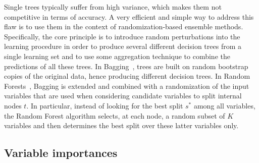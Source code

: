 \documentclass{article}
\begin{document}
Single trees typically suffer from high variance, which makes them not
competitive in terms of accuracy. A very efficient and simple way to address
this flaw is to use them in the context of randomization-based ensemble methods.
Specifically, the core principle is to introduce random perturbations into the
learning procedure in order to produce several different decision trees from a
single learning set and to use some aggregation technique to combine the predictions of all these trees.  In Bagging~\citep{breiman1996bagging}, trees are built on
random bootstrap copies of the original data, hence producing different decision
trees. In Random Forests~\citep{breiman2001rf}, Bagging is extended and combined
with a randomization of the input variables that are used when considering
candidate variables to split internal nodes $t$. In particular, instead of
looking for the best split $s^*$ among all variables, the Random Forest algorithm selects, at
each node, a random subset of $K$ variables and then determines the best split
over these latter variables only.

\subsection{Variable importances}

\end{document}
